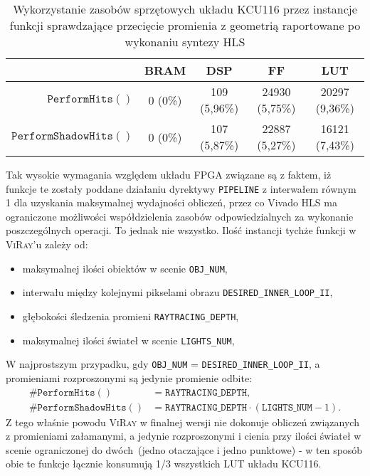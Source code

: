 \begin{enumerate}
\begin{table}[H]
\centering
\caption[Wykorzystanie zasobów sprzętowych układu KCU116 przez instancje funkcji sprawdzające przecięcie promienia z geometrią]{Wykorzystanie zasobów sprzętowych układu KCU116 przez instancje funkcji sprawdzające przecięcie promienia z geometrią raportowane po wykonaniu syntezy HLS}
\label{ch3:tab:perform_hits_util}
\begin{tabular}{|r|c|c|c|c|}
\hline
\multicolumn{1}{|l|}{}                  & \textbf{BRAM} & \textbf{DSP} & \textbf{FF}    & \textbf{LUT}   \\ \hline
\textbf{$\mathtt{PerformHits()}$}       & 0 (0\%)       & 109 (5,96\%) & 24930 (5,75\%) & 20297 (9,36\%) \\ \hline
\textbf{$\mathtt{PerformShadowHits()}$} & 0 (0\%)       & 107 (5,87\%) & 22887 (5,27\%) & 16121 (7,43\%) \\ \hline
\end{tabular}
\end{table}

Tak wysokie wymagania względem układu FPGA związane są z faktem, iż funkcje te zostały poddane działaniu dyrektywy \texttt{PIPELINE} z interwałem równym 1 dla uzyskania maksymalnej wydajności obliczeń, przez co Vivado HLS ma ograniczone możliwości współdzielenia zasobów odpowiedzialnych za wykonanie poszczególnych operacji. To jednak nie wszystko. Ilość instancji tychże funkcji w \textsc{ViRay}'u zależy od:
\begin{itemize}
\item maksymalnej ilości obiektów w scenie \texttt{OBJ\_NUM},
\item interwału między kolejnymi pikselami obrazu \texttt{DESIRED\_INNER\_LOOP\_II},
\item głębokości śledzenia promieni \texttt{RAYTRACING\_DEPTH},
\item maksymalnej ilości świateł w scenie \texttt{LIGHTS\_NUM},
\end{itemize}
W najprostszym przypadku, gdy \texttt{OBJ\_NUM} = \texttt{DESIRED\_INNER\_LOOP\_II}, a promieniami rozproszonymi są jedynie promienie odbite:
\begin{align*}
\#\mathtt{PerformHits()} &= \mathtt{RAYTRACING\_DEPTH},\\
\#\mathtt{PerformShadowHits()} &= \mathtt{RAYTRACING\_DEPTH} \cdot \left(\mathtt{LIGHTS\_NUM} - 1\right).
\end{align*}
Z tego właśnie powodu \textsc{ViRay} w finalnej wersji nie dokonuje obliczeń związanych z promieniami załamanymi, a jedynie rozproszonymi i cienia przy ilości świateł w scenie ograniczonej do dwóch~(jedno otaczające i jedno punktowe) - w ten sposób obie te funkcje łącznie konsumują 1/3 wszystkich LUT układu KCU116. 


\end{enumerate}
